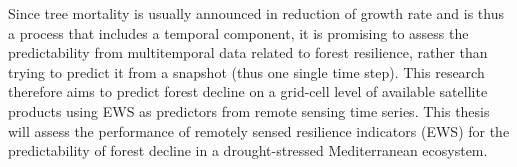 Since tree mortality is usually announced in reduction of growth rate and is thus a process that includes a temporal component, it is promising to assess the predictability from multitemporal data related to forest resilience, rather than trying to predict it from a snapshot (thus one single time step). This research therefore aims to predict forest decline on a grid-cell level of available satellite products using EWS as predictors from remote sensing time series. This thesis will assess the performance of remotely sensed resilience indicators (EWS) for the predictability of forest decline in a drought-stressed Mediterranean ecosystem.\\

